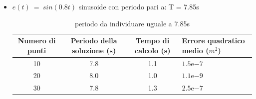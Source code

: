 \documentclass[a4paper,12pt]{report}
\newcommand{\expnumber}[2]{{#1}\mathrm{e}{#2}}
\begin{document}
\begin{itemize}


    \item $ e(t)~=~sin(0.8t)$ sinusoide con periodo pari a:
        T = 7.85s



      \begin{table}[H]
        \caption{periodo da individuare uguale a 7.85s}
        \begin{center}
          \label{tab:limiteInf}
          \begin{tabularx}{\textwidth}{SSSp{0.5\textwidth}}
            \toprule
            {Numero di punti} & {Periodo della soluzione (s)} & {Tempo di calcolo (s)} & {Errore quadratico \newline medio ($m^2$)}\\
            \midrule
            10 &  7.8  & 1.1 & $\expnumber{1.5}{-7}$\\
            20 &  8.0 & 1.0 & $\expnumber{1.1}{-9}$\\
            30 &  7.8  & 1.3 & $\expnumber{2.5}{-7}$\\
            \bottomrule
          \end{tabularx}
        \end{center}
      \end{table}




\end{itemize}
\end{document}
